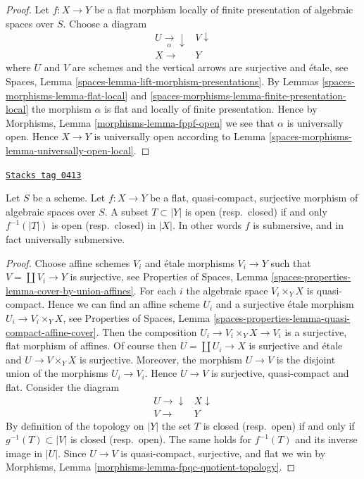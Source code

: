 \begin{proof}
Let $f : X \to Y$ be a flat morphism locally of finite presentation
of algebraic spaces over $S$. Choose a diagram
$$
\begin{array}{cc}U \underset{\alpha}{\longrightarrow}\downarrow & V \downarrow \\ X \longrightarrow & Y\end{array}
$$
where $U$ and $V$ are schemes and the vertical arrows are surjective and
\'etale, see
Spaces, Lemma \ref{spaces-lemma-lift-morphism-presentations}.
By
Lemmas \ref{spaces-morphisms-lemma-flat-local} and \ref{spaces-morphisms-lemma-finite-presentation-local}
the morphism $\alpha$ is flat and locally of finite presentation.
Hence by
Morphisms, Lemma \ref{morphisms-lemma-fppf-open}
we see that $\alpha$ is universally open.
Hence $X \to Y$ is universally open according to
Lemma \ref{spaces-morphisms-lemma-universally-open-local}.
\end{proof}

\begin{lemma}
\label{spaces-morphisms-lemma-fpqc-quotient-topology}
\href{https://stacks.math.columbia.edu/tag/0413}{\texttt{Stacks tag 0413}}

Let $S$ be a scheme.
Let $f : X \to Y$ be a flat, quasi-compact, surjective morphism of
algebraic spaces over $S$.
A subset $T \subset |Y|$ is open (resp.\ closed) if and only
$f^{-1}(|T|)$ is open (resp.\ closed) in $|X|$.
In other words $f$ is submersive, and in fact universally submersive.
\end{lemma}

\begin{proof}
Choose affine schemes $V_i$ and \'etale morphisms $V_i \to Y$ such that
$V = \coprod V_i \to Y$ is surjective, see
Properties of Spaces,
Lemma \ref{spaces-properties-lemma-cover-by-union-affines}.
For each $i$ the algebraic space $V_i \times_Y X$ is quasi-compact.
Hence we can find an affine scheme $U_i$ and a surjective \'etale morphism
$U_i \to V_i \times_Y X$, see
Properties of Spaces,
Lemma \ref{spaces-properties-lemma-quasi-compact-affine-cover}.
Then the composition $U_i \to V_i \times_Y X \to V_i$ is a surjective,
flat morphism of affines.
Of course then $U = \coprod U_i \to X$ is surjective and \'etale
and $U \to V \times_Y X$ is surjective. Moreover, the morphism $U \to V$ is the
disjoint union of the morphisms $U_i \to V_i$. Hence $U \to V$ is surjective,
quasi-compact and flat. Consider the diagram
$$
\begin{array}{cc}U \longrightarrow\downarrow & X \downarrow \\ V \longrightarrow & Y\end{array}
$$
By definition of the topology on $|Y|$ the set $T$ is closed
(resp.\ open) if and only if $g^{-1}(T) \subset |V|$ is closed
(resp.\ open). The same holds for
$f^{-1}(T)$ and its inverse image in $|U|$.
Since $U \to V$ is quasi-compact, surjective,  and flat we win by
Morphisms, Lemma \ref{morphisms-lemma-fpqc-quotient-topology}.
\end{proof}

